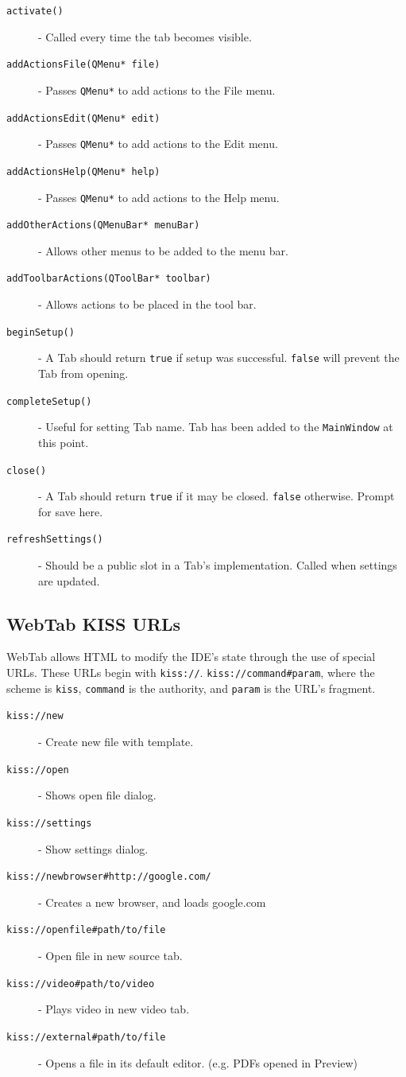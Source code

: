 \documentclass[7pt,letterpaper]{article}
\newcommand{\code}[1]{\texttt{#1}}
\begin{document}
	\begin{description}
	\item[\code{activate()}] - Called every time the tab becomes visible.
	\item[\code{addActionsFile(QMenu* file)}] - Passes \code{QMenu*} to add actions to the File menu.
	\item[\code{addActionsEdit(QMenu* edit)}] - Passes \code{QMenu*} to add actions to the Edit menu.
	\item[\code{addActionsHelp(QMenu* help)}] - Passes \code{QMenu*} to add actions to the Help menu.
	\item[\code{addOtherActions(QMenuBar* menuBar)}] - Allows other menus to be added to the menu bar.
	\item[\code{addToolbarActions(QToolBar* toolbar)}] - Allows actions to be placed in the tool bar.
	\item[\code{beginSetup()}] - A Tab should return \code{true} if setup was successful. \code{false} will prevent the Tab from opening.
	\item[\code{completeSetup()}] - Useful for setting Tab name. Tab has been added to the \code{MainWindow} at this point.
	\item[\code{close()}] - A Tab should return \code{true} if it may be closed. \code{false} otherwise. Prompt for save here.
	\item[\code{refreshSettings()}] - Should be a public slot in a Tab's implementation. Called when settings are updated.
	\end{description}
	\singlespacing
	
	\subsection{WebTab KISS URLs}
	
	WebTab allows HTML to modify the IDE's state through the use of special URLs. These URLs begin with \code{kiss://}.
	\code{kiss://command\#param}, where the scheme is \code{kiss}, \code{command} is the authority, and \code{param} is
	the URL's fragment.
	
	\begin{description}
	\item[\code{kiss://new}] - Create new file with template.
	\item[\code{kiss://open}] - Shows open file dialog.
	\item[\code{kiss://settings}] - Show settings dialog.
	\item[\code{kiss://newbrowser\#http://google.com/}] - Creates a new browser, and loads google.com
	\item[\code{kiss://openfile\#path/to/file}] - Open file in new source tab.
	\item[\code{kiss://video\#path/to/video}] - Plays video in new video tab.
	\item[\code{kiss://external\#path/to/file}] - Opens a file in its default editor. (e.g. PDFs opened in Preview)
	\end{description}
	\singlespacing
	
\end{document}
